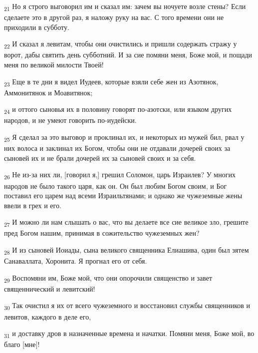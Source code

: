 \begin{tcolorbox}
\textsubscript{21} Но я строго выговорил им и сказал им: зачем вы ночуете возле стены? Если сделаете это в другой раз, я наложу руку на вас. С того времени они не приходили в субботу.
\end{tcolorbox}
\begin{tcolorbox}
\textsubscript{22} И сказал я левитам, чтобы они очистились и пришли содержать стражу у ворот, дабы святить день субботний. И за сие помяни меня, Боже мой, и пощади меня по великой милости Твоей!
\end{tcolorbox}
\begin{tcolorbox}
\textsubscript{23} Еще в те дни я видел Иудеев, которые взяли себе жен из Азотянок, Аммонитянок и Моавитянок;
\end{tcolorbox}
\begin{tcolorbox}
\textsubscript{24} и оттого сыновья их в половину говорят по-азотски, или языком других народов, и не умеют говорить по-иудейски.
\end{tcolorbox}
\begin{tcolorbox}
\textsubscript{25} Я сделал за это выговор и проклинал их, и некоторых из мужей бил, рвал у них волоса и заклинал их Богом, чтобы они не отдавали дочерей своих за сыновей их и не брали дочерей их за сыновей своих и за себя.
\end{tcolorbox}
\begin{tcolorbox}
\textsubscript{26} Не из-за них ли, [говорил я,] грешил Соломон, царь Израилев? У многих народов не было такого царя, как он. Он был любим Богом своим, и Бог поставил его царем над всеми Израильтянами; и однако же чужеземные жены ввели в грех и его.
\end{tcolorbox}
\begin{tcolorbox}
\textsubscript{27} И можно ли нам слышать о вас, что вы делаете все сие великое зло, грешите пред Богом нашим, принимая в сожительство чужеземных жен?
\end{tcolorbox}
\begin{tcolorbox}
\textsubscript{28} И из сыновей Иоиады, сына великого священника Елиашива, один был зятем Санаваллата, Хоронита. Я прогнал его от себя.
\end{tcolorbox}
\begin{tcolorbox}
\textsubscript{29} Воспомяни им, Боже мой, что они опорочили священство и завет священнический и левитский!
\end{tcolorbox}
\begin{tcolorbox}
\textsubscript{30} Так очистил я их от всего чужеземного и восстановил службы священников и левитов, каждого в деле его,
\end{tcolorbox}
\begin{tcolorbox}
\textsubscript{31} и доставку дров в назначенные времена и начатки. Помяни меня, Боже мой, во благо [мне]!
\end{tcolorbox}
